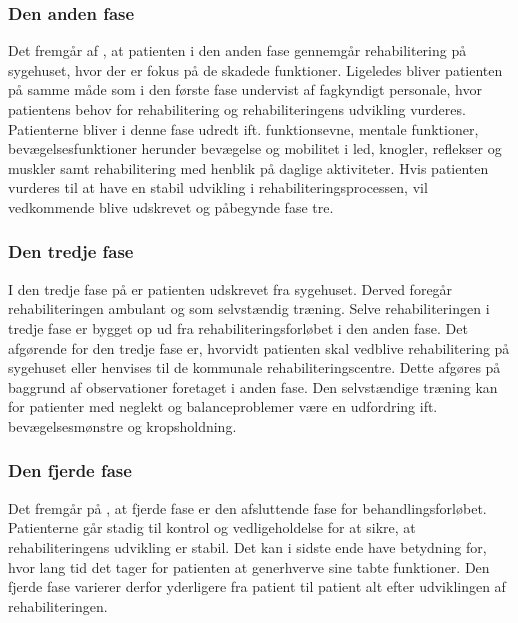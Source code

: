\subsubsection{Den anden fase}
Det fremgår af , at patienten i den anden fase gennemgår rehabilitering på sygehuset, hvor der er fokus på de skadede funktioner. Ligeledes bliver patienten på samme måde som i den første fase undervist af fagkyndigt personale, hvor patientens behov for rehabilitering og rehabiliteringens udvikling vurderes. Patienterne bliver i denne fase udredt ift. funktionsevne, mentale funktioner, bevægelsesfunktioner herunder bevægelse og mobilitet i led, knogler, reflekser og muskler samt rehabilitering med henblik på daglige aktiviteter. Hvis patienten vurderes til at have en stabil udvikling i rehabiliteringsprocessen, vil vedkommende blive udskrevet og påbegynde fase tre. \cite{Sundhedsstyrelsen2011a}


\subsubsection{Den tredje fase}
I den tredje fase på  er patienten udskrevet fra sygehuset. Derved foregår rehabiliteringen ambulant og som selvstændig træning. Selve rehabiliteringen i tredje fase er bygget op ud fra rehabiliteringsforløbet i den anden fase. Det afgørende for den tredje fase er, hvorvidt patienten skal vedblive rehabilitering på sygehuset eller henvises til de kommunale rehabiliteringscentre. Dette afgøres på baggrund af observationer foretaget i anden fase. Den selvstændige træning kan for patienter med neglekt og balanceproblemer være en udfordring ift. bevægelsesmønstre og kropsholdning. \cite{Sundhedsstyrelsen2011a}

\subsubsection{Den fjerde fase}
Det fremgår på , at fjerde fase er den afsluttende fase for behandlingsforløbet. Patienterne går stadig til kontrol og vedligeholdelse for at sikre, at rehabiliteringens udvikling er stabil. Det kan i sidste ende have betydning for, hvor lang tid det tager for patienten at generhverve sine tabte funktioner. Den fjerde fase varierer derfor yderligere fra patient til patient alt efter udviklingen af rehabiliteringen. \cite{Sundhedsstyrelsen2011a} \\

